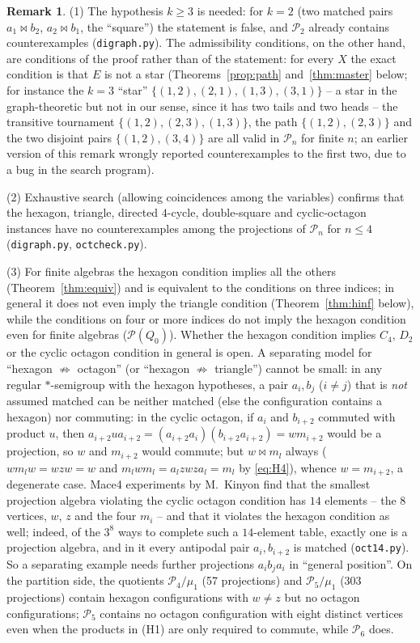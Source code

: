 \documentclass[11pt]{amsart}
\theoremstyle{definition}
\newtheorem{remark}[theorem]{Remark}
\renewcommand{\P}{\mathcal{P}}
\newcommand{\mt}{\bowtie}   %
\begin{document}
\begin{remark}\label{rem:2k}
(1) The hypothesis $k\ge3$ is needed: for $k=2$ (two matched pairs $a_1\mt b_2$, $a_2\mt b_1$, the ``square'') the statement is false, and $\P_2$ already contains counterexamples (\texttt{digraph.py}). The admissibility conditions, on the other hand, are conditions of the proof rather than of the statement: for every $X$ the exact condition is that $E$ is not a star (Theorems~\ref{prop:path} and~\ref{thm:master} below; for instance the $k=3$ ``star'' $\{(1,2),(2,1),(1,3),(3,1)\}$ -- a star in the graph-theoretic but not in our sense, since it has two tails and two heads -- the transitive tournament $\{(1,2),(2,3),(1,3)\}$, the path $\{(1,2),(2,3)\}$ and the two disjoint pairs $\{(1,2),(3,4)\}$ are all valid in $\P_n$ for finite $n$; an earlier version of this remark wrongly reported counterexamples to the first two, due to a bug in the search program).

(2) Exhaustive search (allowing coincidences among the variables) confirms that the hexagon, triangle, directed $4$-cycle, double-square and cyclic-octagon instances have no counterexamples among the projections of $\P_n$ for $n\le4$ (\texttt{digraph.py}, \texttt{octcheck.py}).

(3) For finite algebras the hexagon condition implies all the others (Theorem~\ref{thm:equiv}) and is equivalent to the conditions on three indices; in general it does not even imply the triangle condition (Theorem~\ref{thm:hinf} below), while the conditions on four or more indices do not imply the hexagon condition even for finite algebras ($\P(Q_0)$). Whether the hexagon condition implies $C_4$, $D_2$ or the cyclic octagon condition in general is open. A separating model for ``hexagon $\not\Rightarrow$ octagon'' (or ``hexagon $\not\Rightarrow$ triangle'') cannot be small: in any regular $*$-semigroup with the hexagon hypotheses, a pair $a_i,b_j$ ($i\ne j$) that is \emph{not} assumed matched can be neither matched (else the configuration contains a hexagon) nor commuting: in the cyclic octagon, if $a_i$ and $b_{i+2}$ commuted with product $u$, then $a_{i+2}ua_{i+2}=(a_{i+2}a_i)(b_{i+2}a_{i+2})=wm_{i+2}$ would be a projection, so $w$ and $m_{i+2}$ would commute; but $w\mt m_l$ always ($wm_lw=wzw=w$ and $m_lwm_l=a_lzwza_l=m_l$ by \eqref{eq:H4}), whence $w=m_{i+2}$, a degenerate case. Mace4 experiments by M.~Kinyon find that the smallest projection algebra violating the cyclic octagon condition has $14$ elements -- the $8$ vertices, $w$, $z$ and the four $m_i$ -- and that it violates the hexagon condition as well; indeed, of the $3^8$ ways to complete such a $14$-element table, exactly one is a projection algebra, and in it every antipodal pair $a_i,b_{i+2}$ is matched (\texttt{oct14.py}). So a separating example needs further projections $a_ib_ja_i$ in ``general position''. On the partition side, the quotients $\P_4/\mu_1$ (57 projections) and $\P_5/\mu_1$ (303 projections) contain hexagon configurations with $w\ne z$ but no octagon configurations; $\P_5$ contains no octagon configuration with eight distinct vertices even when the products in (H1) are only required to commute, while $\P_6$ does.
\end{remark}
\end{document}
